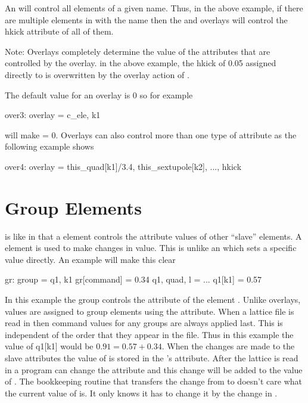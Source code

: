 An  will control all elements of a given name. 
Thus, in the above example, if there are multiple elements in  with 
the name  then the  and  overlays will control the hkick
attribute of all of them. 

Note: Overlays completely determine the value of the attributes that are controlled 
by the overlay. in the above example, the hkick of 0.05 assigned directly 
to  is overwritten by the overlay action of . 

\noindent The default value for an overlay is 0 so for example
\begin{example}
  over3: overlay = {c\_ele}, k1
\end{example}
will make  = 0. Overlays can also control more than one type of attribute
as the following example shows
\begin{example}
  over4: overlay = {this\_quad[k1]/3.4, this\_sextupole[k2], ...}, hkick
\end{example}


\section{Group Elements}
\label{s:group}
 
 is like  in that a  element controls
the attribute values of other ``slave'' elements.  A 
element is used to make changes in value. This is unlike an
 which sets a specific value directly. An example will
make this clear
\begin{example}
  gr: group = {q1}, k1 
  gr[command] = 0.34 
  q1, quad, l = ...
  q1[k1] = 0.57
\end{example}
In this example the group  controls the  attribute of
the element . Unlike overlays, values are assigned to group
elements using the  attribute.  When a lattice file is
read in then command values for any groups are always applied
last. This is independent of the order that they appear in the file.
Thus in this example the value of q1[k1] would be $0.91 = 0.57 + 0.34$.
When the changes are made to the slave attributes the value of
 is stored in the 's  attribute.
After the lattice is read in a program can change the 
attribute and this change will be added to the value of
. The bookkeeping routine that transfers the change from
 to  doesn't care what the current value of
 is. It only knows it has to change it by the change in
.

